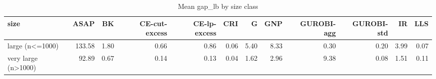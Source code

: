 \begin{table}[htbp]
\centering
\small
\caption{Mean gap\_lb by size class}
\label{tab:E6_scalability_b120_by_size}
\begin{tabular}{lrrrrrrrrrrr}
\toprule
size & ASAP & BK & CE-cut-excess & CE-lp-excess & CRI & G & GNP & GUROBI-agg & GUROBI-std & IR & LLS \\
\midrule
large (n<=1000) & 133.58 & 1.80 & 0.66 & 0.86 & 0.06 & 5.40 & 8.33 & 0.30 & 0.20 & 3.99 & 0.07 \\
very large (n>1000) & 92.89 & 0.67 & 0.14 & 0.13 & 0.04 & 1.62 & 2.96 & 9.38 & 0.08 & 1.51 & 0.11 \\
\bottomrule
\end{tabular}
\end{table}
